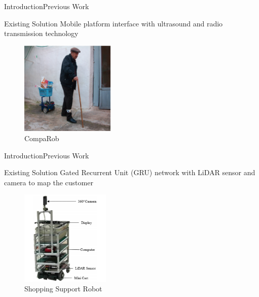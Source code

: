 \documentclass{beamer}
\begin{document}

\begin{frame}{Introduction}{Previous Work}
  \begin{block}{Existing Solution}
        Mobile platform interface with ultrasound and radio transmission technology~\cite{Sales2016-CompaRob}
  \end{block}
    \begin{figure}[b]
        \centering
        \includegraphics[width=0.4\textwidth]{figs/img/CompaRob}
        \caption{CompaRob}
    \end{figure}
\end{frame}


\begin{frame}{Introduction}{Previous Work}
  \begin{block}{Existing Solution}
        Gated Recurrent Unit (GRU) network with LiDAR sensor and camera to map the customer~\cite{islam_lam_fukuda_kobayashi_kuno_2019}
  \end{block}
    \begin{figure}[b]
        \centering
        \includegraphics[width=0.38\textwidth]{figs/img/ShoppingSuportRobot}
        \caption{Shopping Support Robot}
    \end{figure}
\end{frame}
\end{document}
